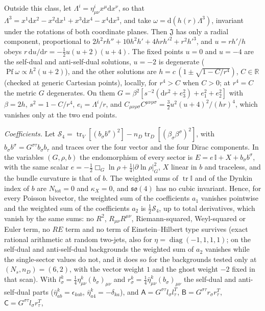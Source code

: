 Outside this class, let \(\Lambda^i=\eta^i_{\mu\nu}x^\mu\mathrm dx^\nu\), so that \(\Lambda^3=x^1\mathrm dx^2-x^2\mathrm dx^1+x^3\mathrm dx^4-x^4\mathrm dx^3\), and take \(\omega=\mathrm d(h(r)\Lambda^3)\), invariant under the rotations of both coordinate planes. Then \(\mathfrak J\) has only a radial component, proportional to \(2h^2rh''+10h^2h'+4hrh'^2+r^2h'^3\), and \(u=rh'/h\) obeys \(r\,\mathrm du/\mathrm dr=-\tfrac12u(u+2)(u+4)\). The fixed points \(u=0\) and \(u=-4\) are the self-dual and anti-self-dual solutions, \(u=-2\) is degenerate (\(\operatorname{Pf}\omega\propto h^2(u+2)\)), and the other solutions are \(h=c\,(1\pm\sqrt{1-C/r^4})\), \(C\in\mathbb R\) (checked at generic Cartesian points), locally, for \(r^4>C\) when \(C>0\); at \(r^4=C\) the metric \(G\) degenerates. On them \(G=\beta^2[s^{-2}(\mathrm dr^2+e_3^2)+e_1^2+e_2^2]\) with \(\beta=2h\), \(s^2=1-C/r^4\), \(e_i=\Lambda^i/r\), and \(C_{\mu\nu\rho\sigma}C^{\mu\nu\rho\sigma}=\tfrac32u^2(u+4)^2/(hr)^4\), which vanishes only at the two end points.



\emph{Coefficients.} Let \(\mathcal S_4=\operatorname{tr}_V[(b_\sigma b^\sigma)^2]-n_D\operatorname{tr}_D[(\beta_\sigma\beta^\sigma)^2]\), with \(b_\sigma b^\sigma=G^{\sigma\tau}b_\sigma b_\tau\) and traces over the four vector and the four Dirac components. In the variables \((G,\rho,b)\) the endomorphism of every sector is \(E=e\,\mathbb I+X+b_\sigma b^\sigma\), with the same scalar \(e=-\tfrac12\Box_G\ln\rho+\tfrac14|\partial\ln\rho|^2_G\), \(X\) linear in \(b\) and traceless, and the bundle curvature is that of \(b\). The weighted sums of \(\operatorname{tr}\mathbb I\) and of the Dynkin index of \(b\) are \(N_{\mathrm{tot}}=0\) and \(\kappa_X=0\), and \(\mathfrak{so}(4)\) has no cubic invariant. Hence, for every Poisson bivector, the weighted sum of the coefficients \(a_1\) vanishes pointwise and the weighted sum of the coefficients \(a_2\) is \(\tfrac12\mathcal S_4\), up to total derivatives, which vanish by the same sums: no \(R^2\), \(R_{\mu\nu}R^{\mu\nu}\), Riemann-squared, Weyl-squared or Euler term, no \(RE\) term and no term of Einstein--Hilbert type survives (exact rational arithmetic at random two-jets, also for \(\eta=\operatorname{diag}(-1,1,1,1)\); on the self-dual and anti-self-dual backgrounds the weighted sum of \(a_2\) vanishes while the single-sector values do not, and it does so for the backgrounds tested only at \((N_s,n_D)=(6,2)\), with the vector weight \(1\) and the ghost weight \(-2\) fixed in that scan). With \(l^k_\sigma=\tfrac14\eta^k_{\mu\nu}(b_\sigma)_{\mu\nu}\) and \(r^k_\sigma=\tfrac14\bar\eta^k_{\mu\nu}(b_\sigma)_{\mu\nu}\) the self-dual and anti-self-dual parts (\(\bar\eta^k_{ab}=\epsilon_{kab}\), \(\bar\eta^k_{a4}=-\delta_{ka}\)), and \(\mathsf A=G^{\sigma\tau}l_\sigma l_\tau^T\), \(\mathsf B=G^{\sigma\tau}r_\sigma r_\tau^T\), \(\mathsf C=G^{\sigma\tau}l_\sigma r_\tau^T\),

